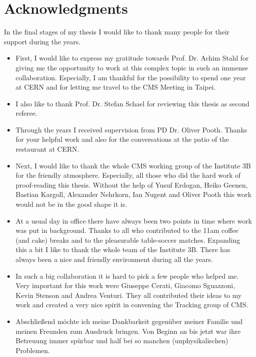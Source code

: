 \chapter*{Acknowledgments}

In the final stages of my thesis I would like to thank many people for their support during the years.

\begin{itemize}

\item{} First, I would like to express my gratitude towards Prof. Dr. Achim Stahl for giving me the opportunity to work at this complex topic in such an immense collaboration. Especially, I am thankful for the possibility to spend one year at CERN and for letting me travel to the CMS Meeting in Taipei.

\item{} I also like to thank Prof. Dr. Stefan Schael for reviewing this thesis as second referee.

\item{} Through the years I received supervision from PD Dr. Oliver Pooth. Thanks for your helpful work and also for the conversations at the patio of the restaurant at CERN.

\item{} Next, I would like to thank the whole CMS working group of the Institute 3B for the friendly atmosphere. Especially, all those who did the hard work of proof-reading this thesis. Without the help of Yusuf Erdogan, Heiko Geenen, Bastian Kargoll, Alexander Nehrkorn, Ian Nugent and Oliver Pooth this work would not be in the good shape it is.

\item{} At a usual day in office there have always been two points in time where work was put in background. Thanks to all who contributed to the 11am coffee (and cake) breaks and to the pleasurable table-soccer matches. Expanding this a bit I like to thank the whole team of the Institute 3B. There has always been a nice and friendly environment during all the years.

\item{} In such a big collaboration it is hard to pick a few people who helped me. Very important for this work were Giuseppe Cerati, Giacomo Sguazzoni, Kevin Stenson and Andrea Venturi. They all contributed their ideas to my work and created a very nice spirit in convening the Tracking group of CMS.



\item{} Abschlie\ss{}end m\"o{}chte ich meine Dankbarkeit gegen\"u{}ber meiner Familie und meinen Freunden zum Ausdruck bringen. Von Beginn an bis jetzt war ihre Betreuung immer sp\"u{}rbar und half bei so manchen (unphysikalischen) Problemen.


\end{itemize}